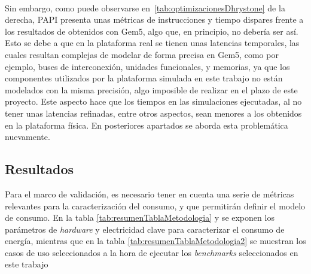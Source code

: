 \paragraph{}
\label{conc:tiemposGem5PAPI}{
Sin embargo, como puede observarse en~\ref{tab:optimizacionesDhrystone} de la derecha, PAPI presenta unas métricas de instrucciones y tiempo dispares frente a los resultados de obtenidos con Gem5, algo que, en principio, no debería ser así. Esto se debe a que en la plataforma real se tienen unas latencias temporales, las cuales resultan complejas de modelar de forma precisa en Gem5, como por ejemplo, buses de interconexión, unidades funcionales, y memorias, ya que los componentes utilizados por la plataforma simulada en este trabajo no están modelados con la misma precisión, algo imposible de realizar en el plazo de este proyecto. Este aspecto hace que los tiempos en las simulaciones ejecutadas, al no tener unas latencias refinadas, entre otros aspectos, sean menores a los obtenidos en la plataforma física. En posteriores apartados se aborda esta problemática nuevamente.}

\subsection{Resultados}
\label{subs:obtencionResultados}

Para el marco de validación, es necesario tener en cuenta una serie de métricas relevantes para la caracterización del consumo, y que permitirán definir el modelo de consumo. En la tabla \ref{tab:resumenTablaMetodologia} y  se exponen los parámetros de \textit{hardware} y electricidad clave para caracterizar el consumo de energía, mientras que en la tabla \ref{tab:resumenTablaMetodologia2} se muestran los casos de uso seleccionados a la hora de ejecutar los \textit{benchmarks} seleccionados en este trabajo

